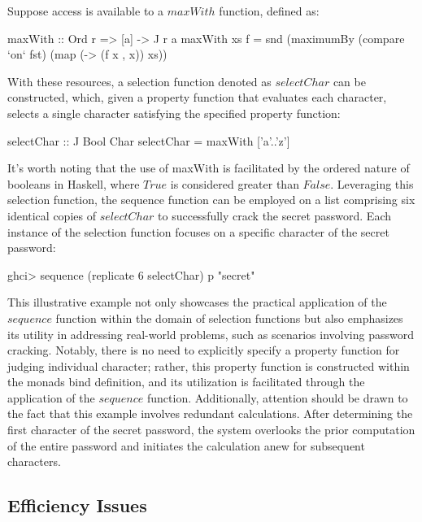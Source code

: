 \documentclass[runningheads]{llncs}
\begin{document}
Suppose access is available to a \(maxWith\) function, defined as:

\begin{code}
maxWith :: Ord r => [a] -> J r a
maxWith xs f = snd (maximumBy (compare `on` fst) 
                              (map (\x -> (f x , x)) xs))
\end{code}

With these resources, a selection function denoted as \(selectChar\) can
be constructed, which, given a property function that evaluates each
character, selects a single character satisfying the specified property
function:

\begin{code}
selectChar :: J Bool Char
selectChar = maxWith ['a'..'z']
\end{code}

It's worth noting that the use of maxWith is facilitated by the ordered
nature of booleans in Haskell, where \(True\) is considered greater than
\(False\). Leveraging this selection function, the sequence function can
be employed on a list comprising six identical copies of \(selectChar\)
to successfully crack the secret password. Each instance of the
selection function focuses on a specific character of the secret
password:

\begin{haskell}
ghci> sequence (replicate 6 selectChar) p
"secret"
\end{haskell}

This illustrative example not only showcases the practical application
of the \(sequence\) function within the domain of selection functions
but also emphasizes its utility in addressing real-world problems, such
as scenarios involving password cracking. Notably, there is no need to
explicitly specify a property function for judging individual character;
rather, this property function is constructed within the monads bind
definition, and its utilization is facilitated through the application
of the \(sequence\) function. Additionally, attention should be drawn to
the fact that this example involves redundant calculations. After
determining the first character of the secret password, the system
overlooks the prior computation of the entire password and initiates the
calculation anew for subsequent characters.

\subsection{Efficiency Issues}\label{efficiency-issues}
\end{document}
